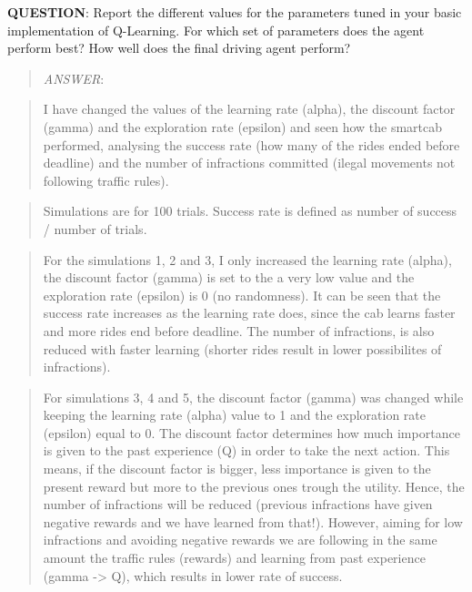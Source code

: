 \documentclass[11pt]{article}
\begin{document}
    \textbf{QUESTION}: Report the different values for the parameters tuned
in your basic implementation of Q-Learning. For which set of parameters
does the agent perform best? How well does the final driving agent
perform?

\begin{quote}
\emph{ANSWER}:
\end{quote}

\begin{quote}
I have changed the values of the learning rate (alpha), the discount
factor (gamma) and the exploration rate (epsilon) and seen how the
smartcab performed, analysing the success rate (how many of the rides
ended before deadline) and the number of infractions committed (ilegal
movements not following traffic rules).
\end{quote}

\begin{quote}
Simulations are for 100 trials. Success rate is defined as number of
success / number of trials.
\end{quote}

\begin{quote}
For the simulations 1, 2 and 3, I only increased the learning rate
(alpha), the discount factor (gamma) is set to the a very low value and
the exploration rate (epsilon) is 0 (no randomness). It can be seen that
the success rate increases as the learning rate does, since the cab
learns faster and more rides end before deadline. The number of
infractions, is also reduced with faster learning (shorter rides result
in lower possibilites of infractions).
\end{quote}

\begin{quote}
For simulations 3, 4 and 5, the discount factor (gamma) was changed
while keeping the learning rate (alpha) value to 1 and the exploration
rate (epsilon) equal to 0. The discount factor determines how much
importance is given to the past experience (Q) in order to take the next
action. This means, if the discount factor is bigger, less importance is
given to the present reward but more to the previous ones trough the
utility. Hence, the number of infractions will be reduced (previous
infractions have given negative rewards and we have learned from that!).
However, aiming for low infractions and avoiding negative rewards we are
following in the same amount the traffic rules (rewards) and learning
from past experience (gamma -\textgreater{} Q), which results in lower
rate of success.
\end{quote}
\end{document}

